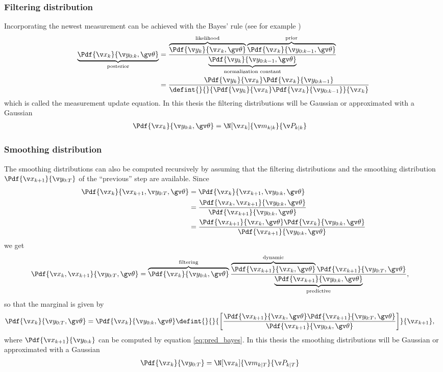 \subsubsection*{Filtering distribution}
Incorporating the newest measurement can be achieved with the Bayes'
rule (see for example \cite{gelman2004})
\begin{align}
	\underbrace{\Pdf{\xk}{\y_{0:k},\Th}}_\text{posterior}&=\frac{\overbrace{\Pdf{\yk}{\xk,\Th}}^\text{likelihood}\overbrace{\Pdf{\xk}{\y_{0:k-1},\Th}}^\text{prior}}{\underbrace{\Pdf{\y_{k}}{\y_{0:k-1},\Th}}_\text{normalization
	constant}}\nonumber\\
	&=\frac{\Pdf{\yk}{\xk}\Pdf{\xk}{\y_{0:k-1}}}{\defint{}{}{\Pdf{\yk}{\xk}\Pdf{\xk}{\y_{0:k-1}}}{\xk}}
	\label{eq:filt_bayes}
\end{align}
which is called the measurement update equation.
In this thesis the filtering distributions will be Gaussian or approximated with a Gaussian
\begin{align}
	\Pdf{\xk}{\y_{0:k},\Th}&=\N[\xk]{\m_{k|k}}{\P_{k|k}}
\end{align}


\subsubsection*{Smoothing distribution}
The smoothing distributions can also be computed recursively by assuming that the filtering distributions
and the smoothing distribution $\Pdf{\x_{k+1}}{\Y}$ of the ``previous'' step are available.
Since
\begin{align*}
	\Pdf{\xk}{\x_{k+1},\Y,\Th}&=\Pdf{\xk}{\x_{k+1},\y_{0:k},\Th}\\
	&=\frac{\Pdf{\xk,\x_{k+1}}{\y_{0:k},\Th}}{\Pdf{\x_{k+1}}{\y_{0:k},\Th}}\\
	&=\frac{\Pdf{\x_{k+1}}{\xk,\Th}\Pdf{\xk}{\y_{0:k},\Th}}{\Pdf{\x_{k+1}}{\y_{0:k},\Th}}
\end{align*}
we get
\begin{align}
	\Pdf{\xk,\x_{k+1}}{\Y,\Th}&=\overbrace{\Pdf{\xk}{\y_{0:k},\Th}}^\text{filtering}\frac{\overbrace{\Pdf{\x_{k+1}}{\xk,\Th}}^\text{dynamic}\Pdf{\x_{k+1}}{\y_{0:T},\Th}}{\underbrace{\Pdf{\x_{k+1}}{\y_{0:k},\Th}}_\text{predictive}},
	\label{eq:smooth_joint_bayes}
\end{align}
so that the marginal is given by
\begin{align}
	\Pdf{\xk}{\Y,\Th}&=\Pdf{\xk}{\y_{0:k},\Th}\defint{}{}{\left[\frac{\Pdf{\x_{k+1}}{\xk,\Th}\Pdf{\x_{k+1}}{\Y,\Th}}{\Pdf{\x_{k+1}}{\y_{0:k},\Th}}\right]}{\x_{k+1}},
	\label{eq:smooth_bayes}
\end{align}
where $\Pdf{\x_{k+1}}{\y_{0:k}}$ can be computed by equation \eqref{eq:pred_bayes}.
In this thesis the smoothing distributions will be Gaussian or approximated with a Gaussian
\begin{align}
	\Pdf{\xk}{\Y}&=\N[\xk]{\m_{k|T}}{\P_{k|T}}
	\label{eq:smoothing_gaussian}
\end{align}

